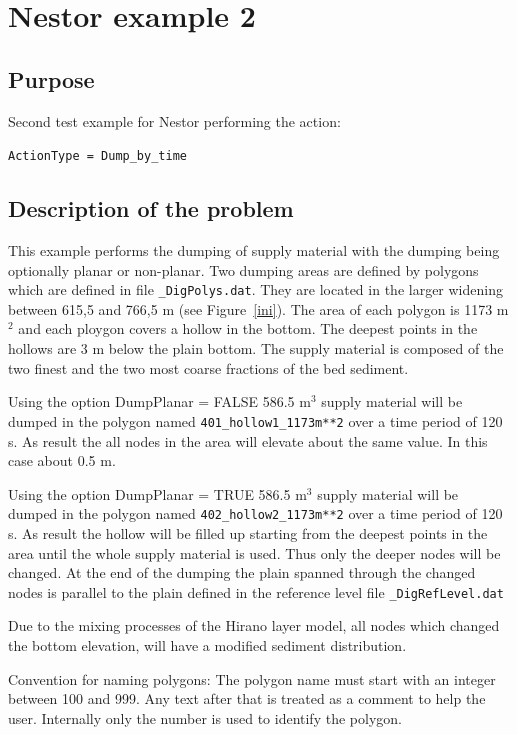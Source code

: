 \chapter{Nestor example 2}
%

%
\section{Purpose}
%
Second test example for Nestor performing the action:

\texttt{ActionType = Dump\_by\_time}
%
\section{Description of the problem}
%
This example performs the dumping of supply material with the dumping being optionally planar or non-planar.
Two dumping areas are defined by polygons which are defined in file \texttt{\_DigPolys.dat}. They are located in the larger widening between 615,5 and 766,5 m (see Figure~\ref{ini}).
The area of each polygon is 1173 m$^2$ and each ploygon covers a hollow in the bottom. The deepest points in the hollows are 3 m below the plain bottom.
The supply material is composed of the two finest and the two most coarse fractions of the bed sediment.


Using the option DumpPlanar = FALSE 586.5 m$^3$ supply material will be dumped in the polygon named \texttt{401\_hollow1\_1173m**2} over a time period of 120 s. As result the all nodes in the area will elevate about the same value. In this case about 0.5 m.

Using the option DumpPlanar = TRUE 586.5 m$^3$ supply material will be dumped in the polygon named \texttt{402\_hollow2\_1173m**2} over a time period of 120 s. As result the hollow will be filled up starting from the deepest points in the area until the whole supply material is used. Thus only the deeper nodes will be changed.
At the end of the dumping the plain spanned through the changed nodes is parallel to the plain  defined in the reference level file \texttt{\_DigRefLevel.dat}

Due to the mixing processes of the Hirano layer model, all nodes which changed the bottom elevation, will have a modified sediment distribution.


Convention for naming polygons: The polygon name must start with an integer between 100 and 999. Any text after that is treated as a comment to  help the user.
Internally only the number is used to identify the polygon.


